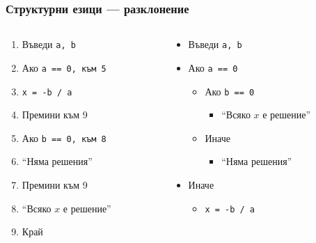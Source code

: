 \documentclass[alsotrans]{beamerswitch}
\begin{document}
\begin{frame}
  \frametitle{Структурни езици — разклонение}

  \begin{columns}
    \begin{column}{.5\textwidth}
      \begin{enumerate}
      \item Въведи \tt a, \tt b
      \item Ако \tt{a == 0}, към 5
      \item \tt{x = -b / a}
      \item Премини към 9
      \item Ако \tt{b == 0}, към 8
      \item ``Няма решения''
      \item Премини към 9
      \item ``Всяко $x$ е решение''
      \item Край
      \end{enumerate}
    \end{column}
    \begin{column}{.5\textwidth}
      \begin{itemize}
      \item Въведи \tt a, \tt b
      \item Ако \tt{a == 0}
        \begin{itemize}
        \item Ако \tt{b == 0}
          \begin{itemize}
          \item ``Всяко $x$ е решение''
          \end{itemize}
        \item Иначе
          \begin{itemize}
          \item ``Няма решения''
          \end{itemize}
        \end{itemize}
      \item Иначе
        \begin{itemize}
        \item \tt{x = -b / a}
        \end{itemize}
      \end{itemize}
    \end{column}
  \end{columns}
\end{frame}
\end{document}
